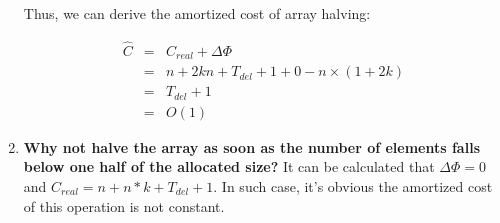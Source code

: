 \begin{enumerate}
Thus, we can derive the amortized cost of array halving:

\[
\begin{array}{lcl}
\hat C & = & C_{real} + \Delta \Phi \\
       & = & n + 2kn + T_{del} + 1 + 0 - n \times (1 + 2k) \\
       & = & T_{del} + 1 \\
       & = & O(1)
\end{array}
\]

\item \textbf{Why not halve the array as soon as the number of elements falls below one half of the allocated size?} It can be calculated that $\Delta \Phi = 0$ and $C_{real} = n + n*k + T_{del} + 1$. In such case, it's obvious the amortized cost of this operation is not constant.

\end{enumerate}